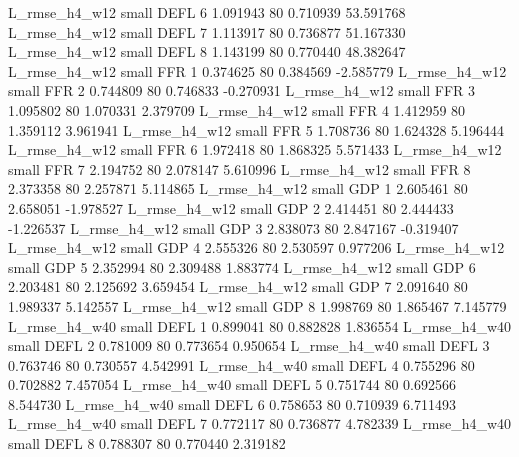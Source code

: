  L_rmse_h4_w12      small     DEFL                 6 1.091943 80       0.710939          53.591768
 L_rmse_h4_w12      small     DEFL                 7 1.113917 80       0.736877          51.167330
 L_rmse_h4_w12      small     DEFL                 8 1.143199 80       0.770440          48.382647
 L_rmse_h4_w12      small      FFR                 1 0.374625 80       0.384569          -2.585779
 L_rmse_h4_w12      small      FFR                 2 0.744809 80       0.746833          -0.270931
 L_rmse_h4_w12      small      FFR                 3 1.095802 80       1.070331           2.379709
 L_rmse_h4_w12      small      FFR                 4 1.412959 80       1.359112           3.961941
 L_rmse_h4_w12      small      FFR                 5 1.708736 80       1.624328           5.196444
 L_rmse_h4_w12      small      FFR                 6 1.972418 80       1.868325           5.571433
 L_rmse_h4_w12      small      FFR                 7 2.194752 80       2.078147           5.610996
 L_rmse_h4_w12      small      FFR                 8 2.373358 80       2.257871           5.114865
 L_rmse_h4_w12      small      GDP                 1 2.605461 80       2.658051          -1.978527
 L_rmse_h4_w12      small      GDP                 2 2.414451 80       2.444433          -1.226537
 L_rmse_h4_w12      small      GDP                 3 2.838073 80       2.847167          -0.319407
 L_rmse_h4_w12      small      GDP                 4 2.555326 80       2.530597           0.977206
 L_rmse_h4_w12      small      GDP                 5 2.352994 80       2.309488           1.883774
 L_rmse_h4_w12      small      GDP                 6 2.203481 80       2.125692           3.659454
 L_rmse_h4_w12      small      GDP                 7 2.091640 80       1.989337           5.142557
 L_rmse_h4_w12      small      GDP                 8 1.998769 80       1.865467           7.145779
 L_rmse_h4_w40      small     DEFL                 1 0.899041 80       0.882828           1.836554
 L_rmse_h4_w40      small     DEFL                 2 0.781009 80       0.773654           0.950654
 L_rmse_h4_w40      small     DEFL                 3 0.763746 80       0.730557           4.542991
 L_rmse_h4_w40      small     DEFL                 4 0.755296 80       0.702882           7.457054
 L_rmse_h4_w40      small     DEFL                 5 0.751744 80       0.692566           8.544730
 L_rmse_h4_w40      small     DEFL                 6 0.758653 80       0.710939           6.711493
 L_rmse_h4_w40      small     DEFL                 7 0.772117 80       0.736877           4.782339
 L_rmse_h4_w40      small     DEFL                 8 0.788307 80       0.770440           2.319182
